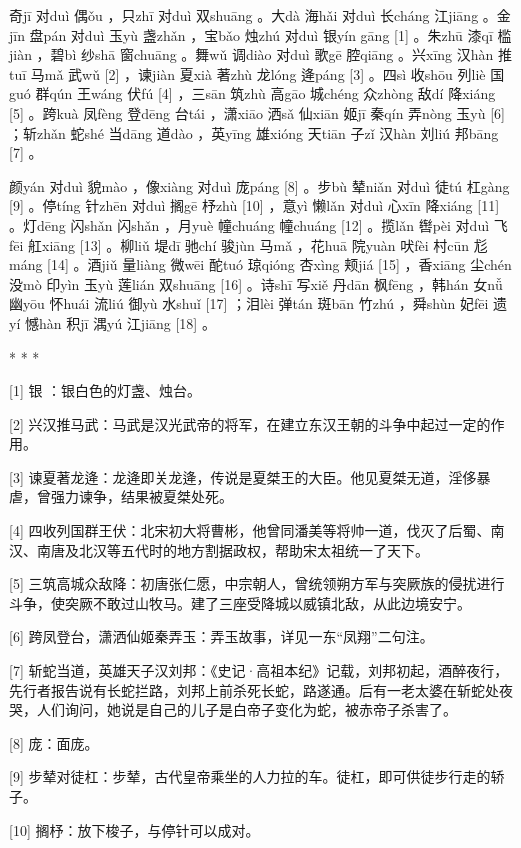 \documentclass[12pt,UTF8]{ctexbook}
\begin{document}
奇jī 对duì 偶ǒu ，只zhī 对duì 双shuāng 。大dà 海hǎi 对duì 长cháng 江jiāng 。金jīn 盘pán 对duì 玉yù 盏zhǎn ，宝bǎo 烛zhú 对duì 银yín gāng [1] 。朱zhū 漆qī 槛jiàn ，碧bì 纱shā 窗chuāng 。舞wǔ 调diào 对duì 歌gē 腔qiāng 。兴xīng 汉hàn 推tuī 马mǎ 武wǔ [2] ，谏jiàn 夏xià 著zhù 龙lóng 逄páng [3] 。四sì 收shōu 列liè 国guó 群qún 王wáng 伏fú [4] ，三sān 筑zhù 高gāo 城chéng 众zhòng 敌dí 降xiáng [5] 。跨kuà 凤fèng 登dēng 台tái ，潇xiāo 洒sǎ 仙xiān 姬jī 秦qín 弄nòng 玉yù [6] ；斩zhǎn 蛇shé 当dāng 道dào ，英yīng 雄xióng 天tiān 子zǐ 汉hàn 刘liú 邦bāng [7] 。

颜yán 对duì 貌mào ，像xiàng 对duì 庞páng [8] 。步bù 辇niǎn 对duì 徒tú 杠gàng [9] 。停tíng 针zhēn 对duì 搁gē 杼zhù [10] ，意yì 懒lǎn 对duì 心xīn 降xiáng [11] 。灯dēng 闪shǎn 闪shǎn ，月yuè 幢chuáng 幢chuáng [12] 。揽lǎn 辔pèi 对duì 飞fēi 舡xiāng [13] 。柳liǔ 堤dī 驰chí 骏jùn 马mǎ ，花huā 院yuàn 吠fèi 村cūn 尨máng [14] 。酒jiǔ 量liàng 微wēi 酡tuó 琼qióng 杏xìng 颊jiá [15] ，香xiāng 尘chén 没mò 印yìn 玉yù 莲lián 双shuāng [16] 。诗shī 写xiě 丹dān 枫fēng ，韩hán 女nǚ 幽yōu 怀huái 流liú 御yù 水shuǐ [17] ；泪lèi 弹tán 斑bān 竹zhú ，舜shùn 妃fēi 遗yí 憾hàn 积jī 湡yú 江jiāng [18] 。



* * *



[1] 银 ：银白色的灯盏、烛台。

[2] 兴汉推马武：马武是汉光武帝的将军，在建立东汉王朝的斗争中起过一定的作用。

[3] 谏夏著龙逄：龙逄即关龙逄，传说是夏桀王的大臣。他见夏桀无道，淫侈暴虐，曾强力谏争，结果被夏桀处死。

[4] 四收列国群王伏：北宋初大将曹彬，他曾同潘美等将帅一道，伐灭了后蜀、南汉、南唐及北汉等五代时的地方割据政权，帮助宋太祖统一了天下。

[5] 三筑高城众敌降：初唐张仁愿，中宗朝人，曾统领朔方军与突厥族的侵扰进行斗争，使突厥不敢过山牧马。建了三座受降城以威镇北敌，从此边境安宁。

[6] 跨凤登台，潇洒仙姬秦弄玉：弄玉故事，详见一东“凤翔”二句注。

[7] 斩蛇当道，英雄天子汉刘邦：《史记·高祖本纪》记载，刘邦初起，酒醉夜行，先行者报告说有长蛇拦路，刘邦上前杀死长蛇，路遂通。后有一老太婆在斩蛇处夜哭，人们询问，她说是自己的儿子是白帝子变化为蛇，被赤帝子杀害了。

[8] 庞：面庞。

[9] 步辇对徒杠：步辇，古代皇帝乘坐的人力拉的车。徒杠，即可供徒步行走的轿子。

[10] 搁杼：放下梭子，与停针可以成对。
\end{document}
